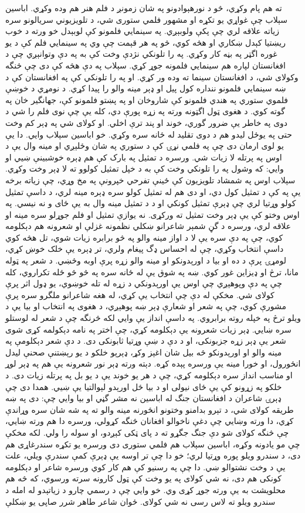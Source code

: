 \documentclass[a4paper]{article}
\begin{document}
\begin{flushright}
ته هم پام وکړي، څو د نورهېوادونو په شان زمونږ د فلم هنر هم وده وکړي. اباسین سېلاب چې غواړي یو تکړه او مشهور فلمي ستوری شي، د تلویزیوني سریالونو سره زیاته علاقه لري چې پکې ولوبېږي. په سینمايي فلمونو کې لوبېدل خو ورته د خوب ریښتیا کېدل ښکاري او هڅه کوي، څو په هر قېمت چې وي په سینمايي فلم کې د یو غوره اگټر په بڼه کار وکړي. په را تلونکي نژدې وخت کې به په دې وتوانېږي چې د افغانستان لپاره هم سینمايي فلمونه جوړ کړي. سېلاب په دې هڅه کې دی چې څنگه وکولای شي، د افغانستان سینما ته وده ور کړي. او په را تلونکي کې په افغانستان کې د ښه سینمايي فلمونو ننداره کول پیل او ډېر مینه والو را پیدا کړي. د نومړي د خوښې فلموي ستوري په هندي فلمونو کې شاروخان او په پښتو فلمونو کې، جهانگیر خان په گوته کوي. د هغوی ټول اگټونه ورته په زړه پورې دي، کله یې چې نوی فلم را شي د دوی په خاطر یې ضرور گوري، خوند او پند ترې اخلي. او کولای شي په ډېر کم وخت حتی په یوځل لیدو هم د دوی تقلید له ځانه سره وکړي. خو اباسین سېلاب وايي. دا یې یو لوی ارمان دی چې په فلمي نړۍ کې د ستوري په شان وځلېږي او مینه وال یې د اوس په پرتله لا زیات شي. ورسره د تمثیل په بارک کې هم ډېره خوشبینې ښيي او وايي: که وشول په را تلونکي وخت کې به د خپل تمثیل کولوو ته لا ډېر وخت وکړي. سېلاب اوس په شمشاد تلویزیون کې ځینې تفرحي خپرونې په مخ وړي، چې زیاته برخه یې په کې د تمثیل کول دي، او دی هم له تمثیل کولو سره ډېره مینه لري، د داسې تمثیل کولو وړتیا لري چې ډېرې تمثیل کونکي او د د تمثیل مینه وال به یې ځای و نه نیسي. په اوس وختو کې یې ډېر وخت تمثیل ته ورکړی. نه یوازې تمثیل او فلم جوړلو سره مینه او علاقه لري، ورسره د گڼ شمېر شاعرانو ښکلي نظمونه غزلې او شعرونه هم دېکلومه کوي، چې په دې سره یې لا د اواز مینه والو په څو برابره زیات شوي، تل هڅه کوي داسې انتخاب وکړي، چې له احساس ډگ پیغام ولري، تر ډېره یې خلک خوښ کړي، لومړۍ پرې د ده او بیا د اورېدونکو او مینه والو زړه پرې اوبه وڅښي. د شعر په ټوله مانا، ترڅ او ډیزاین غور کوي. ښه په شوق یې له ځانه سره په څو څو ځله تکراروي، کله چې په دې وپوهېږي چې اوس یې اورېدونکي د زړه له تله خوښوي، یو ډول اثر پرې کولای شي. مخکې له دې چې انتخاب یې کړي، له هغه شاعرانو ملگرو سره پرې مشورې کوي، چې په شعر او شعارې ډېر ښه پوهېږي، د هغوی په انتخاب او بیا یې د ویلو ترڅ په خپله روته برابروي. په داسې انداز یې وایي لکه څرنگه چې د شعر له لوستلو سره ښايي. ډېر زیات شعرونه یې دېکلومه کړي، چې اختر په نامه دېکولمه کړی شوی شعر یې ډېر زړه جزبونکی، او د دې د ښې وړتیا ثابونکی دی. د دې شعر دېکلومې په مینه والو او اورېدونکو څه بیل شان اغېز وکړ، ډېرېو خلکو د یو رېښتنې صحنې لیدل انځورول، او خورا مینه یې ورسره پېده کړه. دېته ورته ډېر نور شعرونه یې هم په ډېر لوړ او مناسب انداز سره دېکلومه کړي، چې د هر یو خوند یې د یو بل په پرتله زیات دی. د خلکو په زړونو کې یې ځای نیولی او د بیا ځل اورېدو لېوالتیا یې ښيي. همدا دی چې ډېرۍ شاعران د افغانستان جنگ له اباسین نه مشر گڼي او بیا وايي چې: دی په ښه طریقه کولای شي، د تېرو بدامنو وختونو انځورنه مینه والو ته په شه شان سره وړاندې کړي، دا ورته وښایي چې دغې ناخوالو افغانان څنگه کړولي، ورسره دا هم ورته ښايي، چې څنگه کولای شو دې جنگ جگړو ته د پای ټکی کېږدو، او سوله را ولي. لکه مخکې چې مو یادونه وکړه، اباسین سېلاب هم فلمي ستوری دی ورسره یو تکړه سندرغاړی هم دی، د سندرو ویلو پوره وړتیا لري؛ خو دا چې تر اوسه یې ډېرې کمې سندرې ویلي، علت یې د وخت نشتوالو ښي. دا چې په رسنیو کې هم کار کوي ورسره شاعر او دېکلومه کونکی هم دی، نه شي کولای په یو وخت کې ټول کارونه سرته ورسوي، که څه هم محلویشت به یې ورته جوړ کړی وي. خو وايي چې د رسمي چارو د زیاتېدو له امله د سندرو ویلو ته لاس رسی نه شي کولای. ځوان شاعر طاهر شرر صاپی یو ښکلې 
\end{flushright}
\end{document}
